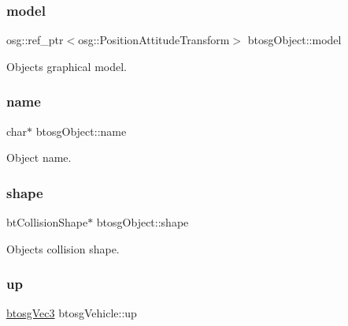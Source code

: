 \subsubsection{\texorpdfstring{model}{model}}
{\footnotesize\ttfamily osg\+::ref\+\_\+ptr$<$osg\+::\+Position\+Attitude\+Transform$>$ btosg\+Object\+::model\hspace{0.3cm}{\ttfamily [inherited]}}



Object\textquotesingle{}s graphical model. 

\mbox{\label{classbtosgObject_a12396e1362797a75473a2e833b579cc9}} 
\subsubsection{\texorpdfstring{name}{name}}
{\footnotesize\ttfamily char$\ast$ btosg\+Object\+::name\hspace{0.3cm}{\ttfamily [inherited]}}



Object name. 

\mbox{\label{classbtosgObject_a0f6a8da01cf643c321bffe86e42604b0}} 
\subsubsection{\texorpdfstring{shape}{shape}}
{\footnotesize\ttfamily bt\+Collision\+Shape$\ast$ btosg\+Object\+::shape\hspace{0.3cm}{\ttfamily [inherited]}}



Object\textquotesingle{}s collision shape. 

\mbox{\label{classbtosgVehicle_a84705afaa9e37bb8a0bd7f6b6f291c26}} 
\subsubsection{\texorpdfstring{up}{up}}
{\footnotesize\ttfamily \mbox{\hyperlink{classbtosgVec3}{btosg\+Vec3}} btosg\+Vehicle\+::up}



